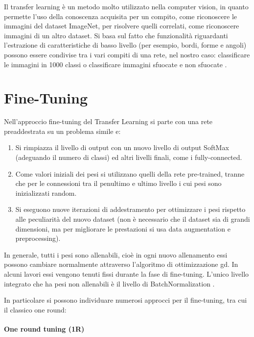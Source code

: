 Il transfer learning è un metodo molto utilizzato nella computer vision, in quanto permette l'uso della conoscenza acquisita per un
compito, come riconoscere le immagini del dataset ImageNet, per risolvere quelli correlati, come riconoscere immagini di un altro dataset. Si basa sul fatto che
funzionalità riguardanti l'estrazione di caratteristiche di basso livello
(per esempio, bordi, forme e angoli) possono essere condivise tra i vari compiti di una rete, nel nostro caso: classificare le immagini in 1000 classi o classificare immagini sfuocate e non sfuocate \cite{patrini_tl}.


\section{Fine-Tuning}\label{fine-tuning}

Nell'approccio fine-tuning del Transfer Learning si parte con una rete preaddestrata su un problema simile e:
\begin{enumerate}
    \item Si rimpiazza il livello di output con un nuovo livello di output \gls{SoftMax} (adeguando il numero di classi) ed altri livelli finali, come i \gls{fully-connected}.
    \item Come valori iniziali dei pesi si utilizzano quelli della rete pre-trained, tranne che per le connessioni tra il penultimo e ultimo livello i cui pesi sono inizializzati random.
    \item Si eseguono nuove iterazioni di addestramento per ottimizzare i pesi rispetto alle peculiarità del nuovo dataset (non è necessario che il dataset sia di grandi dimensioni, ma per migliorare le prestazioni si usa data augmentation e preprocessing).
\end{enumerate}

In generale, tutti i pesi sono allenabili, cioè in  ogni nuovo allenamento essi possono cambiare normalmente attraverso l'algoritmo di ottimizzazione \gls{gd}. In alcuni lavori essi vengono tenuti fissi durante la fase di fine-tuning. L'unico livello integrato che ha pesi non allenabili è il livello di \gls{BatchNormalization} \cite{team_keras_nodate} \cite{lumini_plankton}.

In particolare si possono individuare numerosi approcci per il fine-tuning, tra cui il classico one round:
\paragraph {One round tuning (1R)} \label{one-round-tuning}

